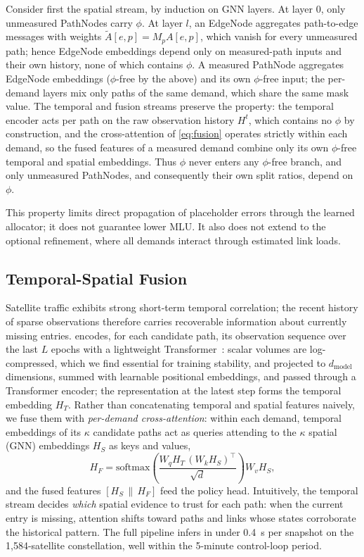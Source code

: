 \begin{IEEEproof}
Consider first the spatial stream, by induction on GNN layers. At layer
$0$, only unmeasured PathNodes carry $\phi$. At layer $l$, an EdgeNode
aggregates path-to-edge messages with weights
$\tilde{A}[e,p] = M_p A[e,p]$, which vanish for every unmeasured path;
hence EdgeNode embeddings depend only on measured-path inputs and their
own history, none of which contains $\phi$. A measured PathNode aggregates
EdgeNode embeddings ($\phi$-free by the above) and its own $\phi$-free
input; the per-demand layers mix only paths of the same demand, which
share the same mask value. The temporal and fusion streams preserve the
property: the temporal encoder acts per path on the raw observation
history $H^t$, which contains no $\phi$ by construction, and the
cross-attention of \cref{eq:fusion} operates strictly within each demand,
so the fused features of a measured demand combine only its own
$\phi$-free temporal and spatial embeddings. Thus $\phi$ never enters any
$\phi$-free branch, and only unmeasured PathNodes, and consequently
their own split ratios, depend on $\phi$.
\end{IEEEproof}

This property limits direct propagation of placeholder errors through the
learned allocator; it does not guarantee lower MLU. It also does not extend
to the optional refinement, where all demands interact through estimated
link loads.

\subsection{Temporal-Spatial Fusion}
\label{sec:fusion}

Satellite traffic exhibits strong short-term temporal correlation; the
recent history of sparse observations therefore carries recoverable
information about currently missing entries. \sysname{} encodes, for each
candidate path, its observation sequence over the last $L$ epochs with a
lightweight Transformer~\cite{vaswani2017}: scalar volumes are
log-compressed, which we find
essential for training stability, and projected to $d_{\mathrm{model}}$
dimensions, summed with learnable positional embeddings, and passed through
a Transformer encoder; the representation at the latest step forms the
temporal embedding $H_T$. Rather than concatenating temporal and spatial
features naively, we fuse them with \emph{per-demand cross-attention}:
within each demand, temporal embeddings of its $\kappa$ candidate paths act
as queries attending to the $\kappa$ spatial (GNN) embeddings $H_S$ as keys
and values,
\begin{equation}
    H_F = \mathrm{softmax}\!\left(
        \frac{W_q H_T \, (W_k H_S)^{\top}}{\sqrt{d}}
    \right) W_v H_S,
    \label{eq:fusion}
\end{equation}
and the fused features $[H_S \,\|\, H_F]$ feed the policy head. Intuitively,
the temporal stream decides \emph{which} spatial evidence to trust for each
path: when the current entry is missing, attention shifts toward paths and
links whose states corroborate the historical pattern. The full pipeline
infers in under 0.4~s per snapshot on the 1{,}584-satellite constellation,
well within the 5-minute control-loop period.

